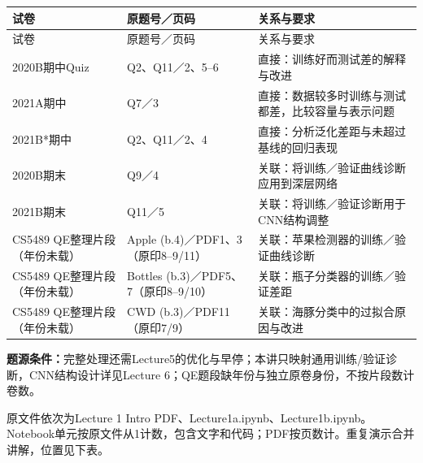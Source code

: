\begingroup\small\setlength{\tabcolsep}{3pt}\renewcommand{\arraystretch}{1.22}
\begin{longtable}{@{}>{\raggedright\arraybackslash}p{}>{\raggedright\arraybackslash}p{}>{\raggedright\arraybackslash}p{}@{}}
\toprule
试卷 & 原题号／页码 & 关系与要求 \\
\midrule\endfirsthead
试卷 & 原题号／页码 & 关系与要求 \\
\midrule\endhead
\bottomrule\endfoot
2020B期中Quiz & Q2、Q11／2、5–6 & 直接：训练好而测试差的解释与改进 \\
2021A期中 & Q7／3 & 直接：数据较多时训练与测试都差，比较容量与表示问题 \\
2021B*期中 & Q2、Q11／2、4 & 直接：分析泛化差距与未超过基线的回归表现 \\
2020B期末 & Q9／4 & 关联：将训练／验证曲线诊断应用到深层网络 \\
2021B期末 & Q11／5 & 关联：将训练／验证诊断用于CNN结构调整 \\
CS5489 QE整理片段（年份未载） & Apple (b.4)／PDF1、3（原印8–9/11） & 关联：苹果检测器的训练／验证曲线诊断 \\
CS5489 QE整理片段（年份未载） & Bottles (b.3)／PDF5、7（原印8–9/10） & 关联：瓶子分类器的训练／验证差距 \\
CS5489 QE整理片段（年份未载） & CWD (b.3)／PDF11（原印7/9） & 关联：海豚分类中的过拟合原因与改进 \\
\end{longtable}\endgroup

\textbf{题源条件：}完整处理还需Lecture5的优化与早停；本讲只映射通用训练/验证诊断，CNN结构设计详见Lecture 6；QE题段缺年份与独立原卷身份，不按片段数计卷数。







原文件依次为Lecture 1 Intro PDF、Lecture1a.ipynb、Lecture1b.ipynb。Notebook单元按原文件从1计数，包含文字和代码；PDF按页数计。重复演示合并讲解，位置见下表。


